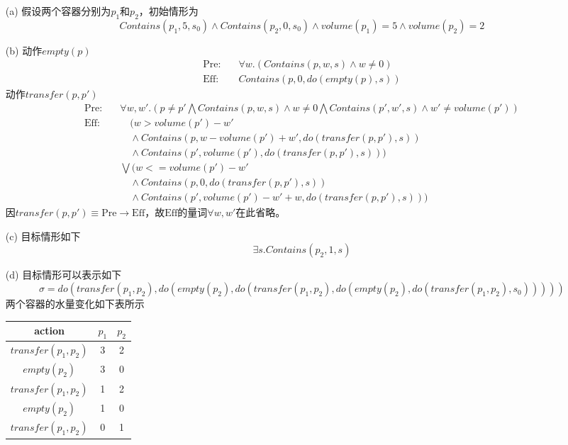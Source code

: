 \documentclass[a4paper, 11pt]{article}
\begin{document}
\begin{answer}
\begin{itemize}
    \item [(a)] 假设两个容器分别为$p_1$和$p_2$，初始情形为
    \[Contains(p_1,5,s_0)\land Contains(p_2,0,s_0)\land volume(p_1)=5\land volume(p_2)=2\]
    \item [(b)] 动作$empty(p)$
    \[\begin{aligned}
        \text{Pre:}\quad & \forall w.(Contains(p,w,s)\land w\ne 0)\\
        \text{Eff:}\quad & Contains(p,0,do(empty(p),s))
    \end{aligned}\]
    动作$transfer(p,p')$
    \[\begin{aligned}
        \text{Pre:}\quad & \forall w,w'.(p\ne p'\bigwedge Contains(p,w,s)\land w\ne 0\bigwedge Contains(p',w',s)\land w'\ne volume(p'))\\
        \text{Eff:}\quad & \quad (w > volume(p')-w'\\
        &\quad \land Contains(p,w-volume(p')+w',do(transfer(p,p'),s))\\
        &\quad \land Contains(p',volume(p'),do(transfer(p,p'),s)))\\
        &\bigvee (w <= volume(p') -w'\\
        &\quad \land Contains(p,0,do(transfer(p,p'),s))\\
        &\quad \land Contains(p',volume(p')-w'+w,do(transfer(p,p'),s)))
    \end{aligned}\]
    因$transfer(p,p')\equiv \text{Pre}\to \text{Eff}$，故$\text{Eff}$的量词$\forall w,w'$在此省略。
    \item [(c)] 目标情形如下
    \[\exists s.Contains(p_2,1,s)\]
    \item [(d)] 目标情形可以表示如下
    \[\sigma=do(transfer(p_1,p_2),do(empty(p_2),do(transfer(p_1,p_2),do(empty(p_2),do(transfer(p_1,p_2),s_0)))))\]
    两个容器的水量变化如下表所示
    \begin{center}
    \begin{tabular}{|c|c|c|}\hline
        action & $p_1$ & $p_2$\\\hline
        $transfer(p_1,p_2)$ & 3 & 2 \\\hline
        $empty(p_2)$ & 3 & 0 \\\hline
        $transfer(p_1,p_2)$ & 1 & 2 \\\hline
        $empty(p_2)$ & 1 & 0 \\\hline
        $transfer(p_1,p_2)$ & 0 & 1 \\\hline
    \end{tabular}
    \end{center}
\end{itemize}
\end{answer}
\begin{flushleft}
\end{flushleft}
\end{document}
